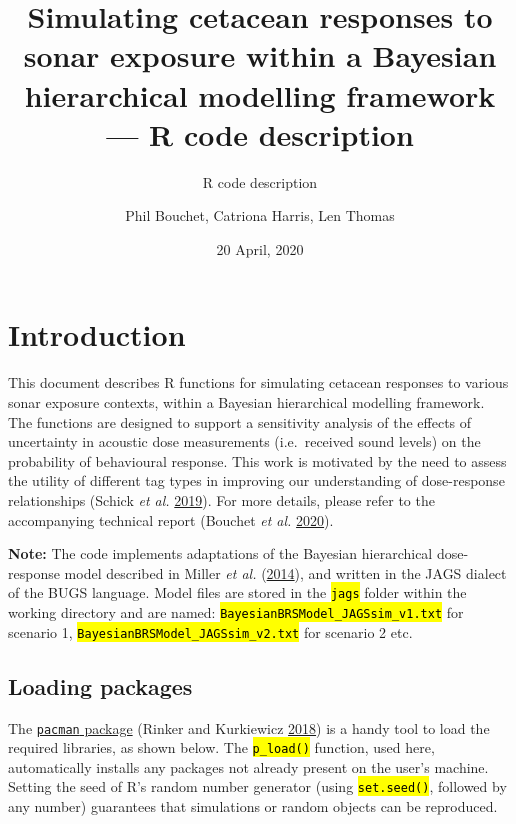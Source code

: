 \documentclass[
]{article}
\title{Simulating cetacean responses to sonar exposure within a Bayesian hierarchical modelling framework --- R code description}
\subtitle{R code description}
\author{Phil Bouchet, Catriona Harris, Len Thomas}
\date{20 April, 2020}
\begin{document}
\maketitle

{
\hypersetup{linkcolor=black}
\setcounter{tocdepth}{3}
\tableofcontents
}
\renewcommand{\figurename}{\textbf{Figure }}
\renewcommand{\caption}{\textbf{Figure }}
\newcommand{\code}[1]{\textcolor{codecolor}{\texttt{\hl{#1}}}}

\section{Introduction}

This document describes R functions for simulating cetacean responses to various sonar exposure contexts, within a Bayesian hierarchical modelling framework. The functions are designed to support a sensitivity analysis of the effects of uncertainty in acoustic dose measurements (i.e.~received sound levels) on the probability of behavioural response. This work is motivated by the need to assess the utility of different tag types in improving our understanding of dose-response relationships (Schick \emph{et al.} \protect\hyperlink{ref-Schick2019}{2019}). For more details, please refer to the accompanying technical report (Bouchet \emph{et al.} \protect\hyperlink{ref-Bouchet2020a}{2020}).

\textbf{Note:} The code implements adaptations of the Bayesian hierarchical dose-response model described in Miller \emph{et al.} (\protect\hyperlink{ref-Miller2014}{2014}), and written in the JAGS dialect of the BUGS language. Model files are stored in the \textcolor{codecolor}{\texttt{\hl{jags}}} folder within the working directory and are named: \textcolor{codecolor}{\texttt{\hl{BayesianBRSModel\_JAGSsim\_v1.txt}}} for scenario 1, \textcolor{codecolor}{\texttt{\hl{BayesianBRSModel\_JAGSsim\_v2.txt}}} for scenario 2 etc.

\subsection{Loading packages}

The \href{https://cran.r-project.org/web/packages/pacman/index.html}{\texttt{pacman} package} (Rinker and Kurkiewicz \protect\hyperlink{ref-Rinker2018}{2018}) is a handy tool to load the required libraries, as shown below. The \textcolor{codecolor}{\texttt{\hl{p\_load()}}} function, used here, automatically installs any packages not already present on the user's machine. Setting the seed of R's random number generator (using \textcolor{codecolor}{\texttt{\hl{set.seed()}}}, followed by any number) guarantees that simulations or random objects can be reproduced.
\end{document}
